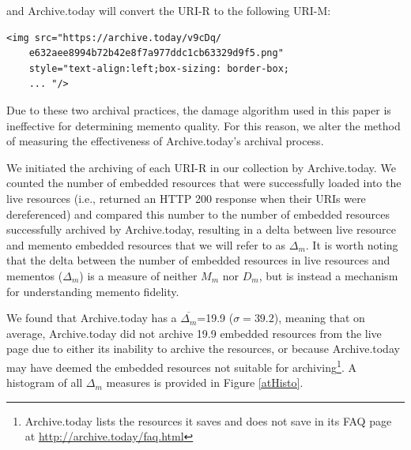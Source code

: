 \noindent and Archive.today will convert the URI-R to the following URI-M:

\begin{verbatim}
<img src="https://archive.today/v9cDq/
	e632aee8994b72b42e8f7a977ddc1cb63329d9f5.png" 
	style="text-align:left;box-sizing: border-box;
	... "/>
\end{verbatim}

Due to these two archival practices, the damage algorithm used in this paper is ineffective for determining memento quality. For this reason, we alter the method of measuring the effectiveness of Archive.today's archival process. 

We initiated the archiving of each URI-R in our collection by Archive.today. We counted the number of embedded resources that were successfully loaded into the live resources (i.e., returned an HTTP 200 response when their URIs were dereferenced) and compared this number to the number of embedded resources successfully archived by Archive.today, resulting in a delta between live resource and memento embedded resources that we will refer to as $\Delta_m$. It is worth noting that the delta between the number of embedded resources in live resources and mementos ($\Delta_m$) is a measure of neither $M_m$ nor $D_m$, but is instead a mechanism for understanding memento fidelity. 

We found that Archive.today has a $\overline{\Delta_m}$=19.9 ($\sigma=39.2$), meaning that on average, Archive.today did not archive 19.9 embedded resources from the live page due to either its inability to archive the resources, or because Archive.today may have deemed the embedded resources not suitable for archiving\footnote{Archive.today lists the resources it saves and does not save in its FAQ page at \url{http://archive.today/faq.html}}. A histogram of all $\Delta_m$ measures is provided in Figure \ref{atHisto}.



